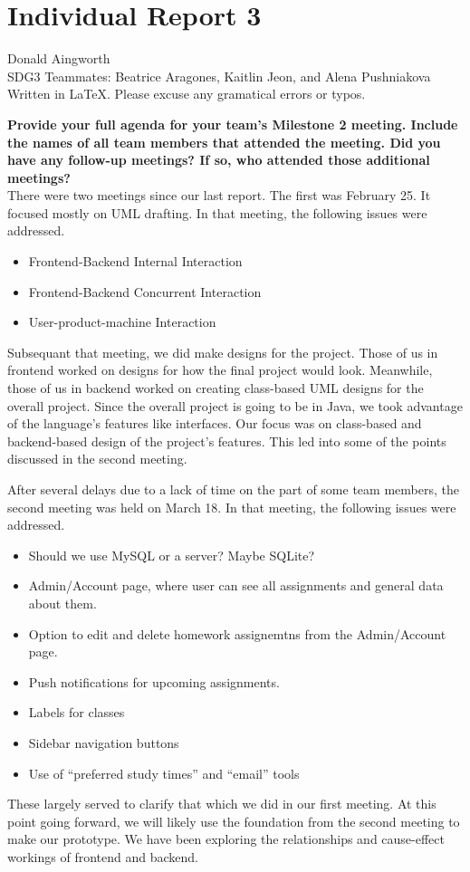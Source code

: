 \documentclass[10pt]{article}
\begin{document}
\section*{Individual Report 3}
Donald Aingworth\\
SDG3 Teammates: Beatrice Aragones, Kaitlin Jeon, and Alena Pushniakova\\
Written in \LaTeX. Please excuse any gramatical errors or typos. 

\textbf{Provide your full agenda for your team's Milestone 2 meeting. Include the names of all team members that attended the meeting. Did you have any follow-up meetings? If so, who attended those additional meetings?}\\
There were two meetings since our last report. 
The first was February 25. It focused mostly on UML drafting. In that meeting, the following issues were addressed.
\begin{itemize}
    \item Frontend-Backend Internal Interaction
    \item Frontend-Backend Concurrent Interaction
    \item User-product-machine Interaction
\end{itemize}
Subsequant that meeting, we did make designs for the project. 
Those of us in frontend worked on designs for how the final project would look. Meanwhile, those of us in backend worked on creating class-based UML designs for the overall project. Since the overall project is going to be in Java, we took advantage of the language's features like interfaces. Our focus was on class-based and backend-based design of the project's features. This led into some of the points discussed in the second meeting.

After several delays due to a lack of time on the part of some team members, the second meeting was held on March 18. In that meeting, the following issues were addressed.
\begin{itemize}
    \item Should we use MySQL or a server? Maybe SQLite?
    \item Admin/Account page, where user can see all assignments and general data about them.
    \item Option to edit and delete homework assignemtns from the Admin/Account page.
    \item Push notifications for upcoming assignments.
    \item Labels for classes
    \item Sidebar navigation buttons
    \item Use of ``preferred study times'' and ``email'' tools
\end{itemize}
These largely served to clarify that which we did in our first meeting. 
At this point going forward, we will likely use the foundation from the second meeting to make our prototype. We have been exploring the relationships and cause-effect workings of frontend and backend.
\end{document}
